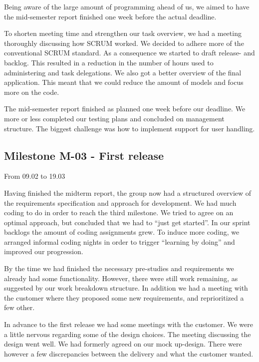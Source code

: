 Being aware of the large amount of programming ahead of us, we aimed to
have the mid-semester report finished one week before the actual
deadline.




To shorten meeting time and strengthen our task overview, we had a
meeting thoroughly discussing how SCRUM worked. We decided to adhere
more of the conventional SCRUM standard. As a consequence we started to
draft release- and backlog. This resulted in a reduction in the number
of hours used to administering and task delegations. We also got a
better overview of the final application. This meant that we could
reduce the amount of models and focus more on the code. 




The mid-semester report finished as planned one week before our
deadline. We more or less completed our testing plans and concluded on
management structure. The biggest challenge was how to implement
support for user handling. 




\subsection{Milestone M-03 - First release}
\label{sec:M03}
From 09.02 to 19.03

Having finished the midterm report, the group now had a structured
overview of the requirements specification and approach for
development. We had much coding to do in order to reach the third
milestone. We tried to agree on an optimal approach, but concluded that
we had to ``just get started''. In
our sprint backlogs the amount of coding assignments grew. To induce
more coding, we arranged informal coding nights in order to trigger
``learning by doing'' and improved
our progression.




By the time we had finished the necessary pre-studies and requirements
we already had some functionality. However, there were still work
remaining, as suggested by our work breakdown structure. In addition we
had a meeting with the customer where they proposed some new
requirements, and reprioritized a few other. 




In advance to the first release we had some meetings with the customer.
We were a little nervous regarding some of the design choices. The
meeting discussing the design went well. We had formerly agreed on our
mock up-design. There were however a few discrepancies between the
delivery and what the customer wanted. \ 




